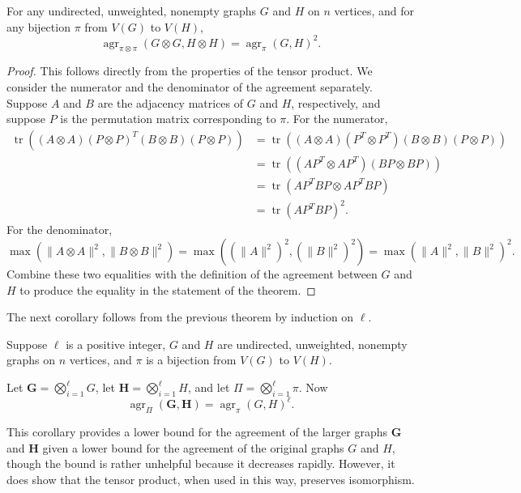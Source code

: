 \documentclass{article}
\newcommand{\1}{\mathbf{1}}
\DeclareMathOperator{\tr}{tr}
\DeclareMathOperator{\agr}{agr}
\begin{document}
\begin{theorem}
  For any undirected, unweighted, nonempty graphs $G$ and $H$ on $n$ vertices, and for any bijection $\pi$ from $V(G)$ to $V(H)$,
  \begin{equation*}
    \agr_{\pi \otimes \pi}(G \otimes G, H \otimes H) = \agr_\pi(G, H)^2.
  \end{equation*}
\end{theorem}
\begin{proof}
  This follows directly from the properties of the tensor product.
  We consider the numerator and the denominator of the agreement separately.
  Suppose $A$ and $B$ are the adjacency matrices of $G$ and $H$, respectively, and suppose $P$ is the permutation matrix corresponding to $\pi$.
  For the numerator,
  \begin{align*}
    \tr((A \otimes A)(P \otimes P)^T(B \otimes B)(P \otimes P)) & = \tr((A \otimes A)(P^T \otimes P^T)(B \otimes B)(P \otimes P)) \\
    & = \tr((AP^T \otimes AP^T)(BP \otimes BP)) \\
    & = \tr(AP^TBP \otimes AP^TBP) \\
    & = \tr(AP^TBP)^2.
  \end{align*}
  For the denominator,
  \begin{equation*}
    \max(\|A \otimes A\|^2, \|B \otimes B\|^2) = \max((\|A\|^2)^2, (\|B\|^2)^2) = \max(\|A\|^2, \|B\|^2)^2.
  \end{equation*}
  Combine these two equalities with the definition of the agreement between $G$ and $H$ to produce the equality in the statement of the theorem.
\end{proof}

The next corollary follows from the previous theorem by induction on $\ell$.

\begin{corollary}
  Suppose $\ell$ is a positive integer, $G$ and $H$ are undirected, unweighted, nonempty graphs on $n$ vertices, and $\pi$ is a bijection from $V(G)$ to $V(H)$.

  Let $\mathbf{G} = \bigotimes_{i = 1}^\ell G$, let $\mathbf{H} = \bigotimes_{i = 1}^\ell H$, and let $\Pi = \bigotimes_{i = 1}^\ell \pi$.
  Now
  \begin{equation*}
    \agr_{\Pi}(\mathbf{G}, \mathbf{H}) = \agr_\pi(G, H)^\ell.
  \end{equation*}
\end{corollary}

This corollary provides a lower bound for the agreement of the larger graphs $\mathbf{G}$ and $\mathbf{H}$ given a lower bound for the agreement of the original graphs $G$ and $H$, though the bound is rather unhelpful because it decreases rapidly.
However, it does show that the tensor product, when used in this way, preserves isomorphism.
\end{document}

